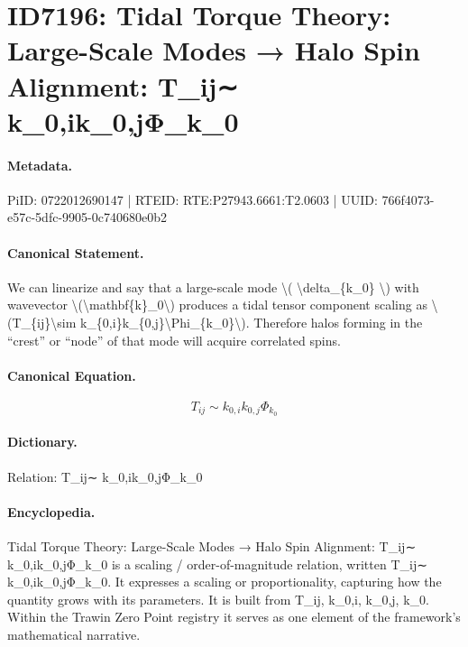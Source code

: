 \section*{ID7196: Tidal Torque Theory: Large-Scale Modes → Halo Spin Alignment: T\_ij∼ k\_0,ik\_0,jΦ\_k\_0}
\paragraph{Metadata.}
PiID: 0722012690147 | RTEID: RTE:P27943.6661:T2.0603 | UUID: 766f4073-e57c-5dfc-9905-0c740680e0b2

\paragraph{Canonical Statement.}
We can linearize and say that a large-scale mode \textbackslash{}( \textbackslash{}delta\_\{k\_0\} \textbackslash{}) with wavevector \textbackslash{}(\textbackslash{}mathbf\{k\}\_0\textbackslash{}) produces a tidal tensor component scaling as \textbackslash{}(T\_\{ij\}\textbackslash{}sim k\_\{0,i\}k\_\{0,j\}\textbackslash{}Phi\_\{k\_0\}\textbackslash{}). Therefore halos forming in the “crest” or “node” of that mode will acquire correlated spins.

\paragraph{Canonical Equation.}
\[
T_{ij}\sim k_{0,i}k_{0,j}\Phi_{k_0}
\]

\paragraph{Dictionary.}
Relation: T\_ij∼ k\_0,ik\_0,jΦ\_k\_0

\paragraph{Encyclopedia.}
Tidal Torque Theory: Large-Scale Modes → Halo Spin Alignment: T\_ij∼ k\_0,ik\_0,jΦ\_k\_0 is a scaling / order-of-magnitude relation, written T\_ij∼ k\_0,ik\_0,jΦ\_k\_0. It expresses a scaling or proportionality, capturing how the quantity grows with its parameters. It is built from T\_ij, k\_0,i, k\_0,j, k\_0. Within the Trawin Zero Point registry it serves as one element of the framework's mathematical narrative.
